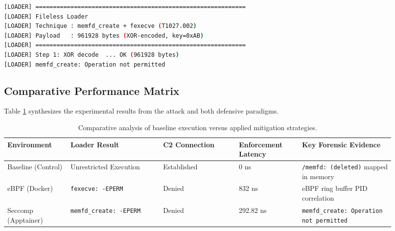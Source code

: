 \begin{lstlisting}[language=bash, caption={Loader process termination resulting from the Seccomp enforcement.}, label={lst:seccomp_denial}]
[LOADER] ============================================================
[LOADER] Fileless Loader
[LOADER] Technique : memfd_create + fexecve (T1027.002)
[LOADER] Payload   : 961928 bytes (XOR-encoded, key=0xAB)
[LOADER] ============================================================
[LOADER] Step 1: XOR decode  ... OK (961928 bytes)
[LOADER] memfd_create: Operation not permitted
\end{lstlisting}

% 
% 

\subsection{Comparative Performance Matrix}
Table \ref{tab:comparative_summary} synthesizes the experimental results from the attack and both defensive paradigms. 

\begin{table}[htbp]
\centering
\caption{Comparative analysis of baseline execution versus applied mitigation strategies.}
\label{tab:comparative_summary}
\begin{tabular}{@{}p{0.15\linewidth}p{0.22\linewidth}p{0.18\linewidth}p{0.15\linewidth}p{0.22\linewidth}@{}}
\toprule
\textbf{Environment} & \textbf{Loader Result} & \textbf{C2 Connection} & \textbf{Enforcement Latency} & \textbf{Key Forensic Evidence} \\ \midrule
Baseline (Control) & Unrestricted Execution & Established & 0 ns & \texttt{/memfd: (deleted)} mapped in memory \\
eBPF (Docker) & \texttt{fexecve: -EPERM} & Denied & 832 ns & eBPF ring buffer PID correlation \\
Seccomp (Apptainer) & \texttt{memfd\_create: -EPERM} & Denied & 292.82 ns & \texttt{memfd\_create: Operation not permitted} \\ \bottomrule
\end{tabular}
\end{table}